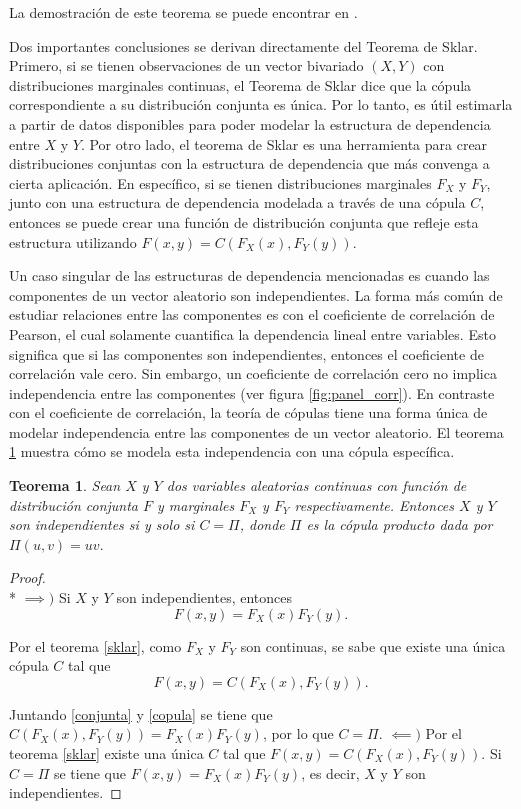 \documentclass[11pt,a4paper]{article}
\newtheorem{theorem}{Teorema}[section]
\begin{document}
La demostración de este teorema se puede encontrar en \citet{nelsen}. 

Dos importantes conclusiones se derivan directamente del Teorema de Sklar. Primero, si se tienen observaciones de un vector bivariado $(X, Y)$ con distribuciones marginales continuas, el Teorema de Sklar dice que la cópula correspondiente a su distribución conjunta es única. Por lo tanto, es útil estimarla a partir de datos disponibles para poder modelar la estructura de dependencia entre $X$ y $Y$. Por otro lado, el teorema de Sklar es una herramienta para crear distribuciones conjuntas con la estructura de dependencia que más convenga a cierta aplicación. En específico, si se tienen distribuciones marginales $F_X$ y $F_Y$, junto con una estructura de dependencia modelada a través de una cópula $C$, entonces se puede crear una función de distribución conjunta que refleje esta estructura utilizando $F(x, y) = C (F_X(x), F_Y(y))$.

Un caso singular de las estructuras de dependencia mencionadas es cuando las componentes de un vector aleatorio son independientes. La forma más común de estudiar relaciones entre las componentes es con el coeficiente de correlación de Pearson, el cual solamente cuantifica la dependencia lineal entre variables. Esto significa que si las componentes son independientes, entonces el coeficiente de correlación vale cero. Sin embargo, un coeficiente de correlación cero no implica independencia entre las componentes (ver figura \ref{fig:panel_corr}). En contraste con el coeficiente de correlación, la teoría de cópulas tiene una forma única de modelar independencia entre las componentes de un vector aleatorio. El teorema \ref{independencia} muestra cómo se modela esta independencia con una cópula específica.

\begin{theorem}
\label{independencia}
Sean $X$ y $Y$ dos variables aleatorias continuas con función de distribución conjunta $F$ y marginales $F_X$ y $F_Y$ respectivamente. Entonces $X$ y $Y$ son independientes si y solo si $C = \Pi$, donde $\Pi$ es la cópula producto dada por $\Pi (u,v) = uv.$
\end{theorem}

\begin{proof}\mbox{}\\*
$\implies\big)$ Si $X$ y $Y$ son independientes, entonces
\begin{equation} \label{conjunta}
F(x, y) = F_X(x)F_Y(y).
\end{equation}

Por el teorema \ref{sklar}, como $F_X$ y $F_Y$ son continuas, se sabe que existe una única cópula $C$ tal que
\begin{equation} \label{copula}
F(x, y) = C(F_X(x), F_Y(y)).
\end{equation}

Juntando \eqref{conjunta} y \eqref{copula} se tiene que $C(F_X(x), F_Y(y)) = F_X(x)F_Y(y)$, por lo que $C = \Pi$.
\newpage
$\impliedby \big)$ Por el teorema \ref{sklar} existe una única $C$ tal que $F(x, y) = C(F_X(x), F_Y(y))$. Si $C = \Pi$ se tiene que $F(x, y) = F_X(x)F_Y(y)$, es decir, $X$ y $Y$ son independientes.
\end{proof}
\end{document}
